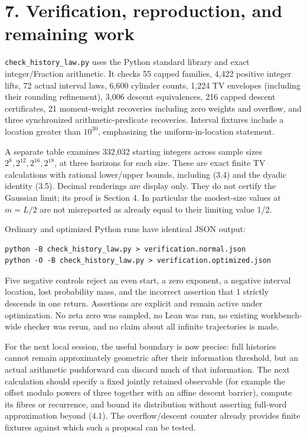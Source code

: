 \section{7. Verification, reproduction, and remaining work}

\nolinkurl{check_history_law.py} uses the Python standard library and
exact integer/Fraction arithmetic. It checks 55 capped families, 4,422
positive integer lifts, 72 actual interval laws, 6,600 cylinder counts,
1,224 TV envelopes (including their rounding refinement), 3,006 descent
equivalences, 216 capped descent certificates, 21 moment-weight
recoveries including zero weights and overflow, and three synchronized
arithmetic-predicate recoveries. Interval fixtures include a location
greater than \(10^{30}\), emphasizing the uniform-in-location statement.

A separate table examines 332,032 starting integers across sample sizes
\(2^8,2^{12},2^{16},2^{18}\), at three horizons for each size. These are
exact finite TV calculations with rational lower/upper bounds, including
(3.4) and the dyadic identity (3.5). Decimal renderings are display
only. They do not certify the Gaussian limit; its proof is Section 4. In
particular the modest-size values at \(m=L/2\) are not misreported as
already equal to their limiting value 1/2.

Ordinary and optimized Python runs have identical JSON output:

\begin{Verbatim}[breaklines=true,breakanywhere=true,fontsize=\scriptsize]
python -B check_history_law.py > verification.normal.json
python -O -B check_history_law.py > verification.optimized.json
\end{Verbatim}

Five negative controls reject an even start, a zero exponent, a negative
interval location, lost probability mass, and the incorrect assertion
that 1 strictly descends in one return. Assertions are explicit and
remain active under optimization. No zeta zero was sampled, no Lean was
run, no existing workbench-wide checker was rerun, and no claim about
all infinite trajectories is made.

For the next local session, the useful boundary is now precise: full
histories cannot remain approximately geometric after their information
threshold, but an actual arithmetic pushforward can discard much of that
information. The next calculation should specify a fixed jointly
retained observable (for example the offset modulo powers of three
together with an affine descent barrier), compute its fibres or
recurrence, and bound its distribution without asserting full-word
approximation beyond (4.1). The overflow/descent counter already
provides finite fixtures against which such a proposal can be tested.

